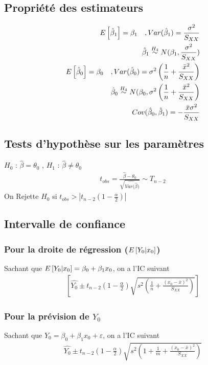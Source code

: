 \documentclass[10pt, french]{article}
\begin{document}
\begin{multicols*}{3}
\subsection*{Propriété des estimateurs}
\begin{align*}
E \left[ \hat{\beta}_1 \right] = \beta_1 \quad , Var(\hat{\beta}_1) = \frac{\sigma^2}{S_{XX}} \\
\hat{\beta}_1 \overset{H_4}{\sim} N(\beta_1, \frac{\sigma^2}{S_{XX}}) \\
E \left[ \hat{\beta}_0 \right] = \beta_0 \quad , Var(\hat{\beta}_0) = \sigma^2 \left( \frac{1}{n} + \frac{\bar{x}^2}{S_{XX}} \right) \\
\hat{\beta}_0 \overset{H_4}{\sim} N(\beta_0, \sigma^2 \left( \frac{1}{n}  + \frac{\bar{x}^2}{S_{XX}} \right) \\
Cov(\hat{\beta}_0, \hat{\beta}_1) = - \frac{\bar{x} \sigma^2}{S_{XX}}
\end{align*}

\subsection*{Tests d'hypothèse sur les paramètres}
$H_0$ : $\hat{\beta} = \theta_0$ , $H_1$ : $\hat{\beta} \neq \theta_0$
\begin{align*}
t_{obs} = \frac{\hat{\beta} - \theta_0}{\sqrt{\hat{Var(\hat{\beta}})}} \sim T_{n-2}
\end{align*}
On Rejette $H_0$ si $t_{obs} > | t_{n-2} (1 - \frac{\alpha}{2})|$

\subsection*{Intervalle de confiance}
\subsubsection*{Pour la droite de régression ($E \left[ Y_0|x_0 \right]$)}
Sachant que $E \left[ Y_0 | x_0 \right] = \beta_0 + \beta_1 x_0$, on a l'IC suivant
\begin{align*}
\left[ \hat{Y_0} \pm t_{n-2} \left(1 - \frac{\alpha}{2} \right) \sqrt{s^2 \left( \frac{1}{n} + \frac{(x_0 - \bar{x})^2}{S_{XX}} \right)} \right]
\end{align*}

\subsubsection*{Pour la prévision de $Y_0$}
Sachant que $Y_0 = \beta_0 + \beta_1 x_0 + \varepsilon$, on a l'IC suivant
\begin{align*}
\hat{Y_0} \pm t_{n-2} \left(1 - \frac{\alpha}{2} \right) \sqrt{s^2 \left( 1 + \frac{1}{m} + \frac{(x_0 - \bar{x})^2}{S_{XX}} \right)}
\end{align*}


\end{multicols*}
\end{document}
